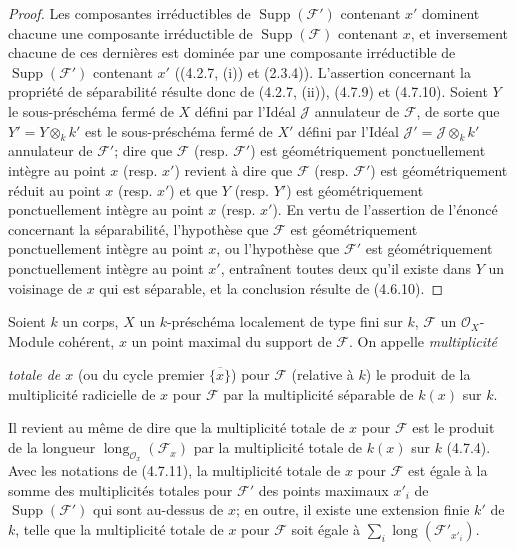 \begin{proof}
Les composantes irréductibles de $\operatorname{Supp}(\mathscr F')$ contenant
$x'$ dominent chacune une composante irréductible de
$\operatorname{Supp}(\mathscr F)$ contenant $x$, et inversement chacune de
ces dernières est dominée par une composante irréductible de
$\operatorname{Supp}(\mathscr F')$ contenant $x'$ ((4.2.7, (i)) et (2.3.4)).
L'assertion concernant la propriété de séparabilité résulte donc de (4.2.7,
(ii)), (4.7.9) et (4.7.10). Soient $Y$ le sous-préschéma fermé de $X$ défini
par l'Idéal $\mathscr J$ annulateur de $\mathscr F$, de sorte que
$Y'=Y\otimes_k k'$ est le sous-préschéma fermé de $X'$ défini par l'Idéal
$\mathscr J'=\mathscr J\otimes_k k'$ annulateur de $\mathscr F'$; dire que
$\mathscr F$ (resp. $\mathscr F'$) est géométriquement ponctuellement intègre
au point $x$ (resp. $x'$) revient à dire que $\mathscr F$ (resp.
$\mathscr F'$) est géométriquement réduit au point $x$ (resp. $x'$) et que
$Y$ (resp. $Y'$) est géométriquement ponctuellement intègre au point $x$
(resp. $x'$). En vertu de l'assertion de l'énoncé concernant la séparabilité,
l'hypothèse que $\mathscr F$ est géométriquement ponctuellement intègre au
point $x$, ou l'hypothèse que $\mathscr F'$ est géométriquement ponctuellement
intègre au point $x'$, entraînent toutes deux qu'il existe dans $Y$ un
voisinage de $x$ qui est séparable, et la conclusion résulte de (4.6.10).
\end{proof}

\begin{definition}[4.7.12]
\label{IV.2.4.7.12-fr}
Soient $k$ un corps, $X$ un $k$-préschéma localement de type fini sur $k$,
$\mathscr F$ un $\mathcal O_X$-Module cohérent, $x$ un point maximal du
support de $\mathscr F$. On appelle \emph{multiplicité}


\emph{totale de $x$} (ou du
cycle premier $\overline{\{x\}}$) pour $\mathscr F$ (relative à $k$) le
produit de la multiplicité radicielle de $x$ pour $\mathscr F$ par la
multiplicité séparable de $k(x)$ sur $k$.
\end{definition}

Il revient au même de dire que la multiplicité totale de $x$ pour $\mathscr F$
est le produit de la longueur
$\operatorname{long}_{\mathcal O_x}(\mathscr F_x)$ par la multiplicité totale
de $k(x)$ sur $k$ (4.7.4). Avec les notations de (4.7.11), la multiplicité
totale de $x$ pour $\mathscr F$ est égale à la somme des multiplicités totales
pour $\mathscr F'$ des points maximaux $x'_i$ de
$\operatorname{Supp}(\mathscr F')$ qui sont au-dessus de $x$; en outre, il
existe une extension finie $k'$ de $k$, telle que la multiplicité totale de
$x$ pour $\mathscr F$ soit égale à
$\sum_i\operatorname{long}(\mathscr F'_{x'_i})$.

